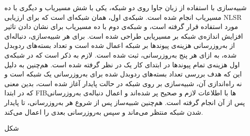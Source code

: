 شبیه‌سازی با استفاده از زبان جاوا روی دو شبکه‌، یکی با شش مسیریاب و دیگری با ده مسیریاب انجام شده است. شبکه‌ی اول، همان شبکه‌ای است که برای ارزیابی NLSR مورد استفاده قرار گرفته است، و شبکه‌ی دوم با ده مسیریاب برای نشان دادن تاثیر افزایش اندازه‌ی شبکه بر مسیریابی طراحی شده است. برای هر شبیه‌سازی، دنباله‌ای از به‌روزرسانی هزینه‌ی پیوندها بر شبکه اعمال شده است و تعداد بسته‌های ردوبدل شده، به ازای هر پنج به‌روزرسانی، ثبت شده است. لازم به ذکر است که در شبکه‌ی اول هزینه‌ی تمام پیوندها در ابتدای کار یک در نظر گرفته شده است. هم‌چنین به دلیل این که هدف بررسی تعداد بسته‌های ردوبدل شده برای به‌روزرسانی یک شبکه است و نه راه‌اندازی آن، شبیه‌سازی بر روی شبکه در حالت پایدار آغاز شده است، بدین معنی که در ابتدا FIBها با اطلاعات لازم و صحیح پر شده‌اند و اعمال دنباله‌ی به‌روزرسانی پس از آن انجام گرفته است. هم‌چنین شبیه‌ساز پس از شروع هر به‌روزرسانی، تا پایدار شدن شبکه منتظر می‌ماند و سپس به‌روزرسانی بعدی را اعمال می‌کند. 

شکل 


